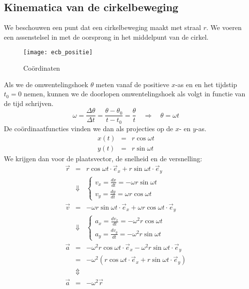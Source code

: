 \subsection{Kinematica van de cirkelbeweging}

We beschouwen een punt dat een cirkelbeweging maakt met straal $r$. We voeren een assenstelsel in met de oorsprong in het middelpunt van de cirkel. 
\begin{figure}[h]
\centering
\texttt{[image: ecb\_positie]}
\caption{Co\"ordinaten}
\end{figure}
Als we de omwentelingshoek $\theta$ meten vanaf de positieve $x$-as en en het tijdstip $t_0=0$ nemen, kunnen we de doorlopen omwentelingshoek als volgt in functie van de tijd schrijven.
\begin{equation*}
\omega=\frac{\Delta\theta}{\Delta t}=\frac{\theta-\theta_0}{t-t_0}=\frac{\theta}{t}\quad\Rightarrow\quad\theta=\omega t
\end{equation*}
De co\"ordinaatfuncties vinden we dan als projecties op de $x$- en $y$-as.
\begin{eqnarray*}
x(t)&=&r\cos\omega t\\
y(t)&=&r\sin\omega t
\end{eqnarray*}
We krijgen dan voor de plaatsvector, de snelheid en de versnelling:
\begin{eqnarray}
\vec{r}&=&r\cos\omega t\cdot\vec{e}_x+r\sin\omega t\cdot\vec{e}_y\nonumber\\
&\Downarrow&
\left\{\begin{array}{l}
v_x=\frac{dx}{dt}=-\omega r\sin\omega t\\
v_y=\frac{dy}{dt}=\omega r\cos\omega t
\end{array}
\right.\nonumber\\
\vec{v}&=&-\omega r\sin\omega t\cdot\vec{e}_x+\omega r\cos\omega t\cdot\vec{e}_y\nonumber\\
&\Downarrow&
\left\{\begin{array}{l}
a_x=\frac{dv_x}{dt}=-\omega^2 r\cos\omega t\\
a_y=\frac{dv_y}{dt}=-\omega^2 r\sin\omega t
\end{array}
\right.\nonumber\\
\vec{a}&=&-\omega^2 r\cos\omega t\cdot\vec{e}_x-\omega^2 r\sin\omega t\cdot\vec{e}_y\nonumber\\
&=&-\omega^2(r\cos\omega t\cdot\vec{e}_x+r\sin\omega t\cdot\vec{e}_y)\nonumber\\
&\Updownarrow&\nonumber\\
\vec{a}&=&-\omega^2\vec{r}\label{versnelling}
\end{eqnarray}
